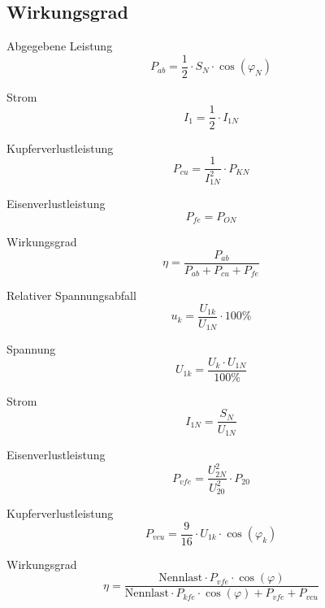 \documentclass[11pt, a4paper, draft, fleqn, twocolumn]{article}
\numberwithin{equation}{subsection}
\begin{document}
\subsection{Wirkungsgrad}

Abgegebene Leistung
\begin{equation}
    P_{ab} = \frac{1}{2} \cdot S_N \cdot \cos(\varphi_N)
\end{equation}

\noindent Strom
\begin{equation}
    I_1 = \frac{1}{2} \cdot I_{1N}
\end{equation}

\noindent Kupferverlustleistung
\begin{equation}
    P_{cu} = \frac{1}{I_{1N}^2} \cdot P_{KN}
\end{equation}

\noindent Eisenverlustleistung
\begin{equation}
    P_{fe} = P_{ON}
\end{equation}

\noindent Wirkungsgrad
\begin{equation}
    \eta = \frac{P_{ab}}{P_{ab} + P_{cu} + P_{fe}}
\end{equation}

\noindent Relativer Spannungsabfall
\begin{equation}
    u_k = \frac{U_{1k}}{U_{1N}} \cdot 100\%
\end{equation}

\noindent Spannung
\begin{equation}
    U_{1k} = \frac{U_k \cdot U_{1N}}{100\%}
\end{equation}

\noindent Strom
\begin{equation}
    I_{1N} = \frac{S_N}{U_{1N}}
\end{equation}

\noindent Eisenverlustleistung
\begin{equation}
    P_{vfe} = \frac{U_{2N}^2}{U_{20}^2} \cdot P_{20}
\end{equation}

\noindent Kupferverlustleistung
\begin{equation}
    P_{vcu} = \frac{9}{16} \cdot U_{1k} \cdot \cos(\varphi_k)
\end{equation}

\noindent Wirkungsgrad
\begin{equation}
    \eta = \frac{\text{Nennlast} \cdot P_{vfe} \cdot \cos(\varphi)}{\text{Nennlast} \cdot P_{kfe} \cdot \cos(\varphi) + P_{vfe} + P_{vcu}}
\end{equation}
\end{document}
